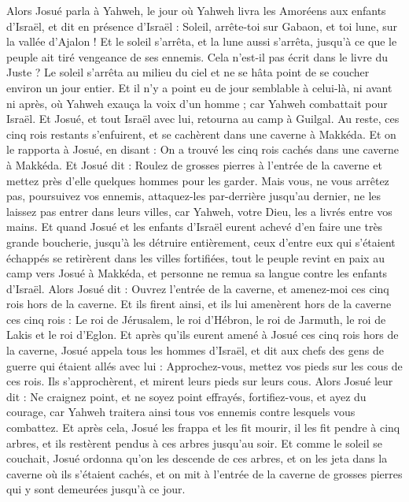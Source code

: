 \begin{multicols}{2}
Alors Josué parla à Yahweh, le jour où Yahweh livra les Amoréens aux enfants d'Israël, et dit en présence d'Israël : Soleil, arrête-toi sur Gabaon, et toi lune, sur la vallée d'Ajalon !
Et le soleil s'arrêta, et la lune aussi s'arrêta, jusqu'à ce que le peuple ait tiré vengeance de ses ennemis. Cela n'est-il pas écrit dans le livre du Juste ? Le soleil s'arrêta au milieu du ciel et ne se hâta point de se coucher environ un jour entier.
Et il n'y a point eu de jour semblable à celui-là, ni avant ni après, où Yahweh exauça la voix d'un homme ; car Yahweh combattait pour Israël.
Et Josué, et tout Israël avec lui, retourna au camp à Guilgal.
Au reste, ces cinq rois restants s'enfuirent, et se cachèrent dans une caverne à Makkéda.
Et on le rapporta à Josué, en disant : On a trouvé les cinq rois cachés dans une caverne à Makkéda.
Et Josué dit : Roulez de grosses pierres à l'entrée de la caverne et mettez près d'elle quelques hommes pour les garder.
Mais vous, ne vous arrêtez pas, poursuivez vos ennemis, attaquez-les par-derrière jusqu'au dernier, ne les laissez pas entrer dans leurs villes, car Yahweh, votre Dieu, les a livrés entre vos mains.
Et quand Josué et les enfants d'Israël eurent achevé d'en faire une très grande boucherie, jusqu'à les détruire entièrement, ceux d'entre eux qui s'étaient échappés se retirèrent dans les villes fortifiées,
tout le peuple revint en paix au camp vers Josué à Makkéda, et personne ne remua sa langue contre les enfants d'Israël.
Alors Josué dit : Ouvrez l'entrée de la caverne, et amenez-moi ces cinq rois hors de la caverne.
Et ils firent ainsi, et ils lui amenèrent hors de la caverne ces cinq rois : Le roi de Jérusalem, le roi d'Hébron, le roi de Jarmuth, le roi de Lakis et le roi d'Eglon.
Et après qu'ils eurent amené à Josué ces cinq rois hors de la caverne, Josué appela tous les hommes d'Israël, et dit aux chefs des gens de guerre qui étaient allés avec lui : Approchez-vous, mettez vos pieds sur les cous de ces rois. Ils s'approchèrent, et mirent leurs pieds sur leurs cous.
Alors Josué leur dit : Ne craignez point, et ne soyez point effrayés, fortifiez-vous, et ayez du courage, car Yahweh traitera ainsi tous vos ennemis contre lesquels vous combattez.
Et après cela, Josué les frappa et les fit mourir, il les fit pendre à cinq arbres, et ils restèrent pendus à ces arbres jusqu'au soir.
Et comme le soleil se couchait, Josué ordonna qu'on les descende de ces arbres, et on les jeta dans la caverne où ils s'étaient cachés, et on mit à l'entrée de la caverne de grosses pierres qui y sont demeurées jusqu'à ce jour.

\end{multicols}
